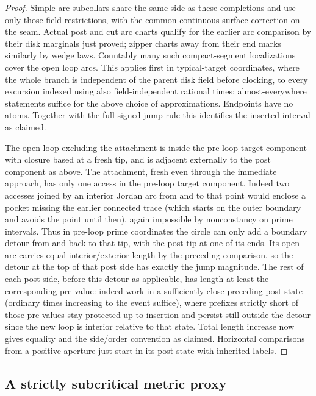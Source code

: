 \begin{proof}
Simple-arc subcollars share the same side as these completions and use only those field restrictions, with the common continuous-surface correction on the seam.
Actual post and cut arc charts qualify for the earlier arc comparison by their disk marginals just proved; zipper charts away from their end marks similarly by wedge laws.
Countably many such compact-segment localizations cover the open loop arcs.
This applies first in typical-target coordinates, where the whole branch is independent of the parent disk field before clocking, to every excursion indexed using also field-independent rational times; almost-everywhere statements suffice for the above choice of approximations.
Endpoints have no atoms.
Together with the full signed jump rule this identifies the inserted interval as claimed.

The open loop excluding the attachment is inside the pre-loop target component with closure based at a fresh tip, and is adjacent externally to the post component as above.
The attachment, fresh even through the immediate approach, has only one access in the pre-loop target component.
Indeed two accesses joined by an interior Jordan arc from and to that point would enclose a pocket missing the earlier connected trace (which starts on the outer boundary and avoids the point until then), again impossible by nonconstancy on prime intervals.
Thus in pre-loop prime coordinates the circle can only add a boundary detour from and back to that tip, with the post tip at one of its ends.
Its open arc carries equal interior/exterior length by the preceding comparison, so the detour at the top of that post side has exactly the jump magnitude.
The rest of each post side, before this detour as applicable, has length at least the corresponding pre-value: indeed work in a sufficiently close preceding post-state (ordinary times increasing to the event suffice), where prefixes strictly short of those pre-values stay protected up to insertion and persist still outside the detour since the new loop is interior relative to that state.
Total length increase now gives equality and the side/order convention as claimed.
Horizontal comparisons from a positive aperture just start in its post-state with inherited labels.

\end{proof}

\subsection{A strictly subcritical metric proxy}\label{proxy:metric}

